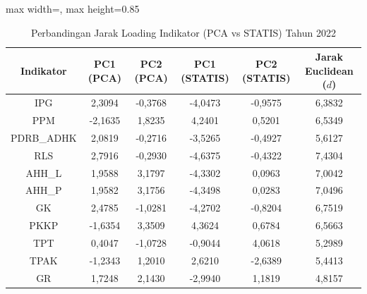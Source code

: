 \begin{table}[H]
\centering
\caption{Perbandingan Jarak Loading Indikator (PCA vs STATIS) Tahun 2022} \label{tab:app2jarak_loading_2022}
\begin{adjustbox}{max width=\textwidth, max height=0.85\textheight}
\begin{tabular}{|c|c|c|c|c|c|}
\hline
\textbf{Indikator} & \textbf{PC1 (PCA)} & \textbf{PC2 (PCA)} & \textbf{PC1 (STATIS)} & \textbf{PC2 (STATIS)} & \textbf{Jarak Euclidean ($d$)} \\
\hline
IPG & 2,3094 & -0,3768 & -4,0473 & -0,9575 & 6,3832 \\
PPM & -2,1635 & 1,8235 & 4,2401 & 0,5201 & 6,5349 \\
PDRB\_ADHK & 2,0819 & -0,2716 & -3,5265 & -0,4927 & 5,6127 \\
RLS & 2,7916 & -0,2930 & -4,6375 & -0,4322 & 7,4304 \\
AHH\_L & 1,9588 & 3,1797 & -4,3302 & 0,0963 & 7,0042 \\
AHH\_P & 1,9582 & 3,1756 & -4,3498 & 0,0283 & 7,0496 \\
GK & 2,4785 & -1,0281 & -4,2702 & -0,8204 & 6,7519 \\
PKKP & -1,6354 & 3,3509 & 4,3624 & 0,6784 & 6,5663 \\
TPT & 0,4047 & -1,0728 & -0,9044 & 4,0618 & 5,2989 \\
TPAK & -1,2343 & 1,2010 & 2,6210 & -2,6389 & 5,4413 \\
GR & 1,7248 & 2,1430 & -2,9940 & 1,1819 & 4,8157 \\
\hline
\end{tabular}
\end{adjustbox}
\end{table}